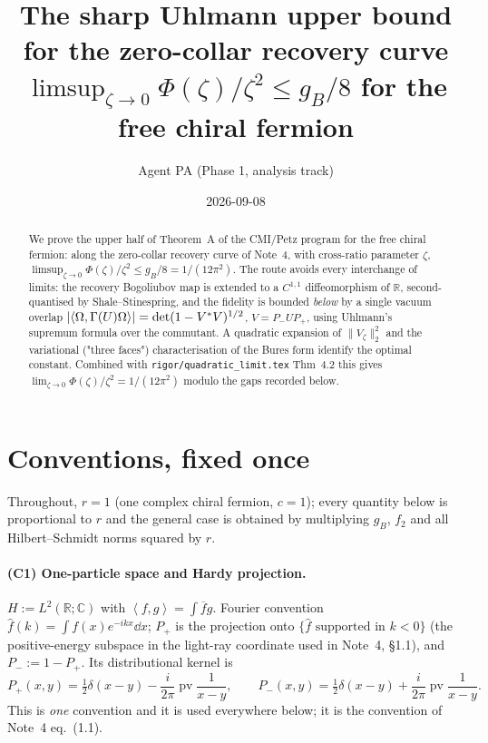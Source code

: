 \documentclass[11pt]{article}
\title{The sharp Uhlmann upper bound for the zero-collar recovery curve\\
\large $\limsup_{\zeta\to0}\Phi(\zeta)/\zeta^{2}\le g_B/8$ for the free chiral fermion}
\author{Agent PA (Phase 1, analysis track)}\date{2026-09-08}
\newcommand{\Pp}{P_+}\newcommand{\Pm}{P_-}
\newcommand{\Gm}{\Gamma}
\newcommand{\ip}[2]{\left\langle #1,#2\right\rangle}\newcommand{\one}{\mathbf 1}
\begin{document}
\maketitle
\begin{abstract}
We prove the upper half of Theorem~A of the CMI/Petz program for the free chiral fermion:
along the zero-collar recovery curve of Note~4, with cross-ratio parameter $\zeta$,
$\limsup_{\zeta\to0}\Phi(\zeta)/\zeta^{2}\le g_B/8=1/(12\pi^{2})$.
The route avoids every interchange of limits: the recovery Bogoliubov map is extended to a
$C^{1,1}$ diffeomorphism of $\mathbb R$, second-quantised by Shale--Stinespring, and the
fidelity is bounded \emph{below} by a single vacuum overlap
$|\langle\Om,\Gm(U)\Om\rangle|=\det(1-V^{*}V)^{1/2}$, $V=\Pm U\Pp$, using Uhlmann's supremum
formula over the commutant.  A quadratic expansion of $\|V_\zeta\|_2^{2}$ and the
variational ("three faces") characterisation of the Bures form identify the optimal
constant.  Combined with \texttt{rigor/quadratic\_limit.tex} Thm~4.2 this gives
$\lim_{\zeta\to0}\Phi(\zeta)/\zeta^{2}=1/(12\pi^{2})$ modulo the gaps recorded below.
\end{abstract}
\tableofcontents
\section{Conventions, fixed once}\label{sec:conv}
Throughout, $r=1$ (one complex chiral fermion, $c=1$); every quantity below is
proportional to $r$ and the general case is obtained by multiplying $g_B$, $f_2$ and all
Hilbert--Schmidt norms squared by $r$.

\paragraph{(C1) One-particle space and Hardy projection.}
$H:=L^2(\mathbb R;\mathbb C)$ with $\ip fg=\int\overline{f}g$.  Fourier convention
$\hat f(k)=\int f(x)e^{-ikx}\dd x$; $\Pp$ is the projection onto $\{\hat f \text{ supported in }k<0\}$
(the positive-energy subspace in the light-ray coordinate used in Note~4, \S1.1), and $\Pm:=1-\Pp$.
Its distributional kernel is
\begin{equation}\label{eq:hardy}
 \Pp(x,y)=\tfrac12\delta(x-y)-\frac{i}{2\pi}\operatorname{pv}\frac1{x-y},
 \qquad
 \Pm(x,y)=\tfrac12\delta(x-y)+\frac{i}{2\pi}\operatorname{pv}\frac1{x-y}.
\end{equation}
This is \emph{one} convention and it is used everywhere below; it is the convention of
Note~4 eq.~(1.1).
\end{document}
